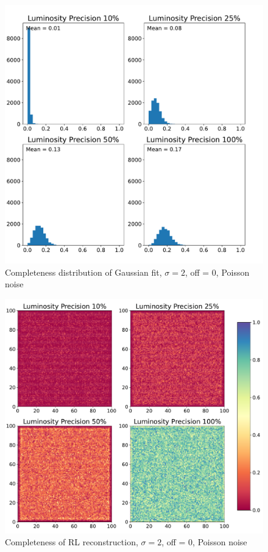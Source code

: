 \documentclass[a4paper]{article}
\begin{document}
		\begin{figure}[h!]
			\centering
			\includegraphics[height=0.4\textheight]{poissgauss2_hists_gauss.pdf}
			\caption{Completeness distribution of Gaussian fit, $\sigma = 2$, off = 0, Poisson noise}
			\label{fig:phg}
		\end{figure}
		\newpage
		\begin{figure}[h!]
			\centering
			\includegraphics[height=0.4\textheight]{poissgauss2_boards_lucy.pdf}
			\caption{Completeness of RL reconstruction, $\sigma = 2$, off = 0, Poisson noise}
			\label{fig:pbl}
		\end{figure}
\end{document}
